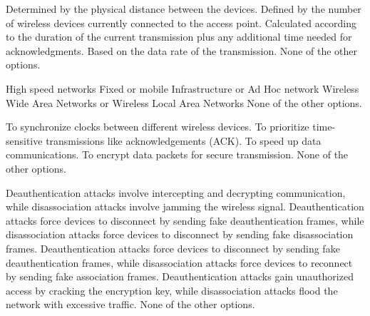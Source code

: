 \begin{checkboxes}
    \choice Determined by the physical distance between the devices.
    \choice Defined by the number of wireless devices currently connected to the access point.
    \CorrectChoice Calculated according to the duration of the current transmission plus any additional time needed for acknowledgments.
    \choice Based on the data rate of the transmission.
    \choice None of the other options.
\end{checkboxes}

\begin{checkboxes}
    \choice High speed networks
    \CorrectChoice Fixed or mobile
    \CorrectChoice Infrastructure or Ad Hoc network
    \CorrectChoice Wireless Wide Area Networks or Wireless Local Area Networks
    \choice None of the other options.
\end{checkboxes}

\begin{checkboxes}
    \choice To synchronize clocks between different wireless devices.
    \choice To prioritize time-sensitive transmissions like acknowledgements (ACK).
    \choice To speed up data communications.
    \choice To encrypt data packets for secure transmission.
    \CorrectChoice None of the other options.
\end{checkboxes}

\begin{checkboxes}
    \choice Deauthentication attacks involve intercepting and decrypting communication, while disassociation attacks involve jamming the wireless signal.
    \CorrectChoice Deauthentication attacks force devices to disconnect by sending fake deauthentication frames, while disassociation attacks force devices to disconnect by sending fake disassociation frames.
    \choice Deauthentication attacks force devices to disconnect by sending fake deauthentication frames, while disassociation attacks force devices to reconnect by sending fake association frames.
    \choice Deauthentication attacks gain unauthorized access by cracking the encryption key, while disassociation attacks flood the network with excessive traffic.
    \choice None of the other options.
\end{checkboxes}


